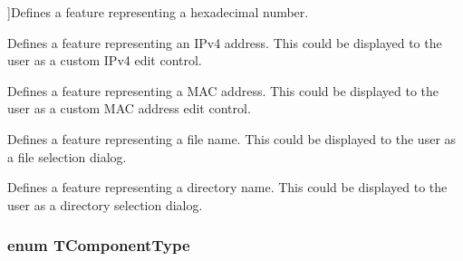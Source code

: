 \begin{Desc}
\begin{description}
{}]Defines a feature representing a hexadecimal number. \item[{\em 
\hypertarget{group___common_interface_gga1e2d7ac6b3bb3ff1fe4bb53c4aa808eaacf937fdb271d97b80be879ea3624370e}{cr\+I\+Pv4\+Address}\label{group___common_interface_gga1e2d7ac6b3bb3ff1fe4bb53c4aa808eaacf937fdb271d97b80be879ea3624370e}
}]Defines a feature representing an I\+Pv4 address. This could be displayed to the user as a custom I\+Pv4 edit control. \item[{\em 
\hypertarget{group___common_interface_gga1e2d7ac6b3bb3ff1fe4bb53c4aa808eaa82dab843b051ff57acace6724b3e247e}{cr\+M\+A\+C\+Address}\label{group___common_interface_gga1e2d7ac6b3bb3ff1fe4bb53c4aa808eaa82dab843b051ff57acace6724b3e247e}
}]Defines a feature representing a M\+A\+C address. This could be displayed to the user as a custom M\+A\+C address edit control. \item[{\em 
\hypertarget{group___common_interface_gga1e2d7ac6b3bb3ff1fe4bb53c4aa808eaa9bac16267b3c291380ddd23539ae045e}{cr\+File\+Name}\label{group___common_interface_gga1e2d7ac6b3bb3ff1fe4bb53c4aa808eaa9bac16267b3c291380ddd23539ae045e}
}]Defines a feature representing a file name. This could be displayed to the user as a file selection dialog. \item[{\em 
\hypertarget{group___common_interface_gga1e2d7ac6b3bb3ff1fe4bb53c4aa808eaa64df99316cecd54001cdd7e299d8fc3e}{cr\+Directory\+Name}\label{group___common_interface_gga1e2d7ac6b3bb3ff1fe4bb53c4aa808eaa64df99316cecd54001cdd7e299d8fc3e}
}]Defines a feature representing a directory name. This could be displayed to the user as a directory selection dialog. \end{description}
\end{Desc}
\hypertarget{group___common_interface_ga7dbe9709a3bdae0b29581ff4f6fca3ff}{
\subsubsection[{T\+Component\+Type}]{\setlength{\rightskip}{0pt plus 5cm}enum {\bf T\+Component\+Type}}}\label{group___common_interface_ga7dbe9709a3bdae0b29581ff4f6fca3ff}


